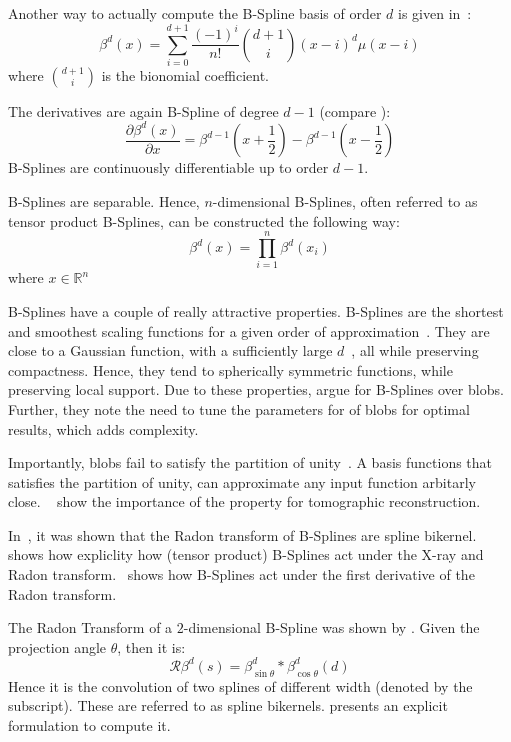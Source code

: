 Another way to actually compute the B-Spline basis of order \(d\) is given
in~\cite{unser_fast_1991}:
\begin{equation}
	\beta^d(x) = \sum_{i=0}^{d+1} \frac{(-1)^i}{n!} \binom{d+1}{i}(x - i)^d\mu(x - i)
\end{equation}
where \(\binom{d+1}{i}\) is the bionomial coefficient.

The derivatives are again B-Spline of degree \(d-1\) (compare \cite{unser_splines_1999}):
\begin{equation}
	\frac{\partial \beta^d(x)}{\partial x} = \beta^{d-1}\left(x + \frac{1}{2}\right) -
	\beta^{d-1}\left(x - \frac{1}{2}\right)
\end{equation}
B-Splines are continuously differentiable up to order \(d-1\).

B-Splines are separable. Hence, \(n\)-dimensional B-Splines, often referred to as tensor product
B-Splines, can be constructed the following way:
\begin{equation}
	\beta^d(x) = \prod^n_{i=1} \beta^d(x_i)
\end{equation}
where \(x \in \mathbb{R}^n\)

B-Splines have a couple of really attractive properties. B-Splines are the shortest and smoothest
scaling functions for a given order of approximation~\cite{momey_b-spline_2012}. They are close to a
Gaussian function, with a sufficiently large $d$~\cite{momey_b-spline_2012}, all while preserving
compactness. Hence, they tend to spherically symmetric functions, while preserving local support.
Due to these properties, \citeauthor*{momey_new_2011}\cite{momey_new_2011} argue for B-Splines over
blobs. Further, they note the need to tune the parameters for of blobs for optimal results, which
adds complexity.

Importantly, blobs fail to satisfy the partition of unity~\cite{nilchian_fast_2013}. A basis
functions that satisfies the partition of unity, can approximate any input function arbitarly close.
~\cite{nilchian_fast_2013} show the importance of the property for tomographic reconstruction.

In~\cite{horbelt_discretization_2002}, it was shown that the Radon transform of B-Splines are spline
bikernel.~\cite{entezari_box_2012} shows how expliclity how (tensor product) B-Splines act under
the X-ray and Radon transform.~\cite{nilchian_differential_2012} shows how B-Splines act under
the first derivative of the Radon transform.

The Radon Transform of a \(2\)-dimensional B-Spline was shown by
\citeauthor*{horbelt_discretization_2002}\cite{horbelt_discretization_2002}. Given the projection
angle \(\theta\), then it is:
\begin{equation}
	\mathscr{R}\beta^d(s) = \beta^d_{\sin\theta} * \beta^d_{\cos\theta}(d)
\end{equation}
Hence it is the convolution of two splines of different width (denoted by the subscript). These are
referred to as spline bikernels. \citeauthor*{horbelt_discretization_2002} presents an explicit
formulation to compute it.

